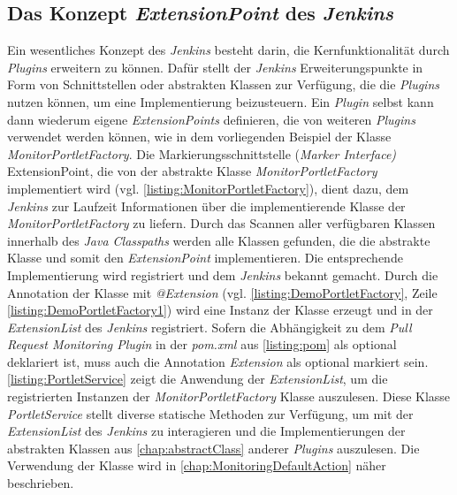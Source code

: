 \subsection{Das Konzept \textit{ExtensionPoint} des \textit{Jenkins}}

Ein wesentliches Konzept des \textit{Jenkins} besteht darin, die Kernfunktionalität durch \textit{Plugins} erweitern zu können. Dafür stellt der \textit{Jenkins} Erweiterungspunkte in Form von Schnittstellen oder abstrakten Klassen zur Verfügung, die die \textit{Plugins} nutzen können, um eine Implementierung beizusteuern. Ein \textit{Plugin} selbst kann dann wiederum eigene \textit{ExtensionPoints} definieren, die von weiteren \textit{Plugins} verwendet werden können, wie in dem vorliegenden Beispiel der Klasse \textit{MonitorPortletFactory}.
Die Markierungsschnittstelle (\textit{Marker Interface)} {ExtensionPoint}, die von der abstrakte Klasse \textit{MonitorPortletFactory} implementiert wird (vgl. \autoref{listing:MonitorPortletFactory}), dient dazu, dem \textit{Jenkins} zur Laufzeit Informationen über die implementierende Klasse der \textit{MonitorPortletFactory} zu liefern. Durch das Scannen aller verfügbaren Klassen innerhalb des \textit{Java Classpaths} werden alle Klassen gefunden, die die abstrakte Klasse und somit den \textit{ExtensionPoint} implementieren. Die entsprechende Implementierung wird registriert und dem \textit{Jenkins} bekannt gemacht. Durch die Annotation der Klasse mit \textit{@Extension} (vgl. \autoref{listing:DemoPortletFactory}, Zeile \autoref{listing:DemoPortletFactory1}) wird eine Instanz der Klasse erzeugt und in der \textit{ExtensionList} des \textit{Jenkins} registriert. Sofern die Abhängigkeit zu dem \textit{Pull Request Monitoring Plugin} in der \textit{pom.xml} aus \autoref{listing:pom} als optional deklariert ist, muss auch die Annotation \textit{Extension} als optional markiert sein. 
\autoref{listing:PortletService} zeigt die Anwendung der \textit{ExtensionList}, um die registrierten Instanzen der \textit{MonitorPortletFactory} Klasse auszulesen. Diese Klasse \textit{PortletService} stellt diverse statische Methoden zur Verfügung, um mit der \textit{ExtensionList} des \textit{Jenkins} zu interagieren und die Implementierungen der abstrakten Klassen aus \autoref{chap:abstractClass} anderer \textit{Plugins} auszulesen. Die Verwendung der Klasse wird in \autoref{chap:MonitoringDefaultAction} näher beschrieben.



